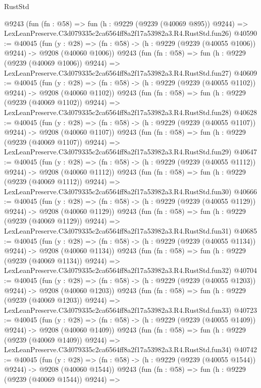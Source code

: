 \begin{lexlean}{RustStd}
\begin{coremodule}
    @9243
    (fun (fn : @58) =>
    fun (h : @9229 (@9239 (@40069 @895)) @9244) =>
    LexLeanPreserve.C3d079335c2ca6564ff8a2f17a53982a3.R4.RustStd.fun26)
@40590 := @40045
    (fun (y : @28) =>
    (fn : @58) -> (h : @9229 (@9239 (@40055 @1006)) @9244) -> @9208 (@40060 @1006))
    @9243
    (fun (fn : @58) =>
    fun (h : @9229 (@9239 (@40069 @1006)) @9244) =>
    LexLeanPreserve.C3d079335c2ca6564ff8a2f17a53982a3.R4.RustStd.fun27)
@40609 := @40045
    (fun (y : @28) =>
    (fn : @58) -> (h : @9229 (@9239 (@40055 @1102)) @9244) -> @9208 (@40060 @1102))
    @9243
    (fun (fn : @58) =>
    fun (h : @9229 (@9239 (@40069 @1102)) @9244) =>
    LexLeanPreserve.C3d079335c2ca6564ff8a2f17a53982a3.R4.RustStd.fun28)
@40628 := @40045
    (fun (y : @28) =>
    (fn : @58) -> (h : @9229 (@9239 (@40055 @1107)) @9244) -> @9208 (@40060 @1107))
    @9243
    (fun (fn : @58) =>
    fun (h : @9229 (@9239 (@40069 @1107)) @9244) =>
    LexLeanPreserve.C3d079335c2ca6564ff8a2f17a53982a3.R4.RustStd.fun29)
@40647 := @40045
    (fun (y : @28) =>
    (fn : @58) -> (h : @9229 (@9239 (@40055 @1112)) @9244) -> @9208 (@40060 @1112))
    @9243
    (fun (fn : @58) =>
    fun (h : @9229 (@9239 (@40069 @1112)) @9244) =>
    LexLeanPreserve.C3d079335c2ca6564ff8a2f17a53982a3.R4.RustStd.fun30)
@40666 := @40045
    (fun (y : @28) =>
    (fn : @58) -> (h : @9229 (@9239 (@40055 @1129)) @9244) -> @9208 (@40060 @1129))
    @9243
    (fun (fn : @58) =>
    fun (h : @9229 (@9239 (@40069 @1129)) @9244) =>
    LexLeanPreserve.C3d079335c2ca6564ff8a2f17a53982a3.R4.RustStd.fun31)
@40685 := @40045
    (fun (y : @28) =>
    (fn : @58) -> (h : @9229 (@9239 (@40055 @1134)) @9244) -> @9208 (@40060 @1134))
    @9243
    (fun (fn : @58) =>
    fun (h : @9229 (@9239 (@40069 @1134)) @9244) =>
    LexLeanPreserve.C3d079335c2ca6564ff8a2f17a53982a3.R4.RustStd.fun32)
@40704 := @40045
    (fun (y : @28) =>
    (fn : @58) -> (h : @9229 (@9239 (@40055 @1203)) @9244) -> @9208 (@40060 @1203))
    @9243
    (fun (fn : @58) =>
    fun (h : @9229 (@9239 (@40069 @1203)) @9244) =>
    LexLeanPreserve.C3d079335c2ca6564ff8a2f17a53982a3.R4.RustStd.fun33)
@40723 := @40045
    (fun (y : @28) =>
    (fn : @58) -> (h : @9229 (@9239 (@40055 @1409)) @9244) -> @9208 (@40060 @1409))
    @9243
    (fun (fn : @58) =>
    fun (h : @9229 (@9239 (@40069 @1409)) @9244) =>
    LexLeanPreserve.C3d079335c2ca6564ff8a2f17a53982a3.R4.RustStd.fun34)
@40742 := @40045
    (fun (y : @28) =>
    (fn : @58) -> (h : @9229 (@9239 (@40055 @1544)) @9244) -> @9208 (@40060 @1544))
    @9243
    (fun (fn : @58) =>
    fun (h : @9229 (@9239 (@40069 @1544)) @9244) =>

\end{coremodule}
\end{lexlean}
